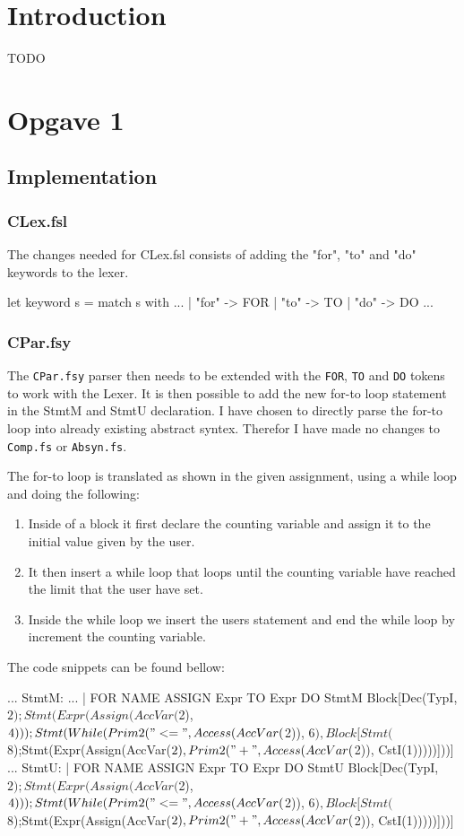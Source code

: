 \section*{Introduction}
TODO

\section{Opgave 1}
\subsection{Implementation}
\subsubsection*{CLex.fsl}
The changes needed for CLex.fsl consists of adding the "for", "to" and "do"
keywords to the lexer.
\begin{fs}
let keyword s =
    match s with
    ...
    | "for"     -> FOR
    | "to"      -> TO
    | "do"      -> DO
    ...
\end{fs}
\subsubsection*{CPar.fsy}
The \texttt{CPar.fsy} parser then needs to be extended with the \texttt{FOR}, \texttt{TO}
and \texttt{DO} tokens to work with the Lexer. It is then possible to add the
new for-to loop statement in the StmtM and StmtU declaration. I have chosen to
directly parse the for-to loop into already existing abstract syntex. Therefor I
have made no changes to \texttt{Comp.fs} or \texttt{Absyn.fs}.

The for-to loop is translated as shown in the given assignment, using a while
loop and doing the following: 
\begin{enumerate}
    \item Inside of a block it first declare the counting variable and assign it
        to the initial value given by the user. 
    \item It then insert a while loop that loops until the counting variable
        have reached the limit that the user have set. 
    \item Inside the while loop we insert the users statement and end the while
        loop by increment the counting variable.
\end{enumerate}
The code snippets can be found bellow:

\begin{fs}
...
StmtM:
...
  | FOR NAME ASSIGN Expr TO Expr DO StmtM { Block[Dec(TypI, $2); Stmt(Expr(Assign(AccVar($2), $4))); Stmt(While(Prim2("<=", Access(AccVar($2)), $6), Block[Stmt($8);Stmt(Expr(Assign(AccVar($2), Prim2("+", Access(AccVar($2)), CstI(1)))))]))] }
...
StmtU:
  | FOR NAME ASSIGN Expr TO Expr DO StmtU { Block[Dec(TypI, $2); Stmt(Expr(Assign(AccVar($2), $4))); Stmt(While(Prim2("<=", Access(AccVar($2)), $6), Block[Stmt($8);Stmt(Expr(Assign(AccVar($2), Prim2("+", Access(AccVar($2)), CstI(1)))))]))] }
\end{fs}
